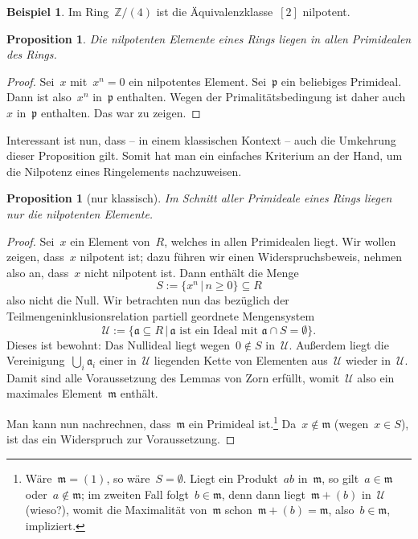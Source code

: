 \documentclass[a4paper,ngerman,12pt]{scrartcl}
\theoremstyle{definition}
\newtheorem{bsp}[defn]{Beispiel}
\theoremstyle{plain}
\newtheorem{prop}[defn]{Proposition}
\theoremstyle{remark}
\newcommand{\ZZ}{\mathbb{Z}}
\renewcommand{\aa}{\mathfrak{a}}
\newcommand{\pp}{\mathfrak{p}}
\newcommand{\mm}{\mathfrak{m}}
\newcommand{\U}{\mathcal{U}}
\renewcommand{\_}{\mathpunct{.}\,}
\newcommand{\?}{\,{:}\,}
\begin{document}
\begin{bsp}Im Ring~$\ZZ/(4)$ ist die Äquivalenzklasse~$[2]$ nilpotent.\end{bsp}

\begin{prop}Die nilpotenten Elemente eines Rings liegen in allen Primidealen
des Rings.\end{prop}
\begin{proof}Sei~$x$ mit~$x^n = 0$ ein nilpotentes Element. Sei~$\pp$ ein
beliebiges Primideal. Dann ist also~$x^n$ in~$\pp$ enthalten. Wegen der
Primalitätsbedingung ist daher auch~$x$ in~$\pp$ enthalten. Das war zu
zeigen.\end{proof}

Interessant ist nun, dass -- in einem klassischen Kontext -- auch die Umkehrung
dieser Proposition gilt. Somit hat man ein einfaches Kriterium an der Hand, um
die Nilpotenz eines Ringelements nachzuweisen.

\begin{prop}[nur klassisch]\label{intersectprim}%
Im Schnitt aller Primideale eines Rings liegen nur
die nilpotenten Elemente.\end{prop}
\begin{proof}Sei~$x$ ein Element von~$R$, welches in allen Primidealen liegt.
Wir wollen zeigen, dass~$x$ nilpotent ist; dazu führen wir einen
Widerspruchsbeweis, nehmen also an, dass~$x$ nicht nilpotent ist. Dann enthält
die Menge
\[ S := \{ x^n \,|\, n \geq 0 \} \subseteq R \]
also nicht die Null. Wir betrachten nun das bezüglich der
Teilmengeninklusionsrelation partiell geordnete Mengensystem
\[ \U := \{ \aa \subseteq R \,|\, \text{$\aa$ ist ein Ideal mit~$\aa \cap S =
\emptyset$} \}. \]
Dieses ist bewohnt: Das Nullideal liegt wegen~$0 \not\in S$ in~$\U$. Außerdem
liegt die Vereinigung~$\bigcup_i \aa_i$ einer in~$\U$ liegenden Kette von
Elementen aus~$\U$ wieder in~$\U$. Damit sind alle Voraussetzung des Lemmas von
Zorn erfüllt, womit~$\U$ also ein maximales Element~$\mm$ enthält.

Man kann nun nachrechnen, dass~$\mm$ ein Primideal ist.\footnote{Wäre~$\mm =
(1)$, so wäre~$S = \emptyset$. Liegt ein Produkt~$ab$ in~$\mm$, so gilt~$a \in
\mm$ oder~$a \not\in \mm$; im zweiten Fall folgt~$b \in \mm$, denn dann
liegt~$\mm + (b)$ in~$\U$ (wieso?), womit die Maximalität von~$\mm$
schon~$\mm + (b) = \mm$, also~$b \in \mm$, impliziert.} Da~$x \not\in \mm$
(wegen~$x \in S$), ist das ein Widerspruch zur Voraussetzung.
\end{proof}
\end{document}

